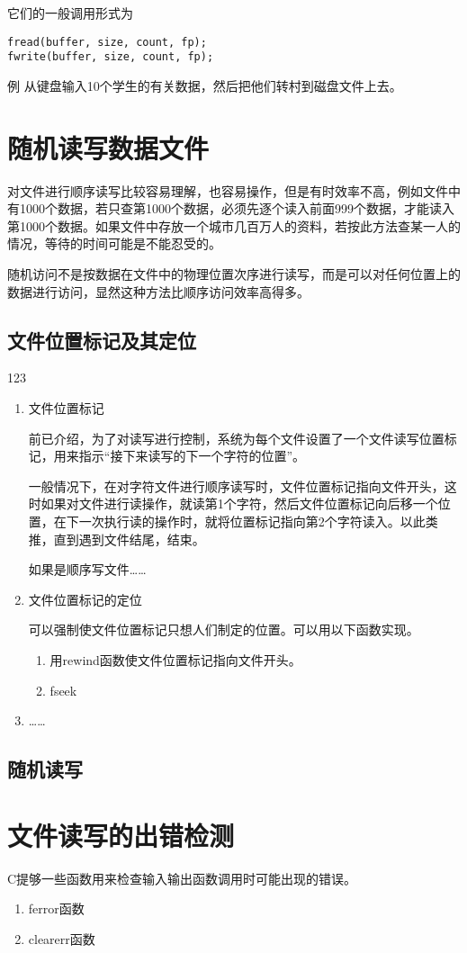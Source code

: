 它们的一般调用形式为
\begin{lstlisting}
fread(buffer, size, count, fp);
fwrite(buffer, size, count, fp);
\end{lstlisting}

例 从键盘输入10个学生的有关数据，然后把他们转村到磁盘文件上去。
\section{随机读写数据文件}
对文件进行顺序读写比较容易理解，也容易操作，但是有时效率不高，例如文件中有1000个数据，若只查第1000个数据，必须先逐个读入前面999个数据，才能读入第1000个数据。如果文件中存放一个城市几百万人的资料，若按此方法查某一人的情况，等待的时间可能是不能忍受的。

随机访问不是按数据在文件中的物理位置次序进行读写，而是可以对任何位置上的数据进行访问，显然这种方法比顺序访问效率高得多。
\subsection{文件位置标记及其定位}
123
\begin{enumerate}
	\item 文件位置标记

		前已介绍，为了对读写进行控制，系统为每个文件设置了一个文件读写位置标记，用来指示“接下来读写的下一个字符的位置”。

		一般情况下，在对字符文件进行顺序读写时，文件位置标记指向文件开头，这时如果对文件进行读操作，就读第1个字符，然后文件位置标记向后移一个位置，在下一次执行读的操作时，就将位置标记指向第2个字符读入。以此类推，直到遇到文件结尾，结束。

		如果是顺序写文件……
	\item 文件位置标记的定位

		可以强制使文件位置标记只想人们制定的位置。可以用以下函数实现。
		\begin{enumerate}
			\item 用rewind函数使文件位置标记指向文件开头。
			\item fseek
		\end{enumerate}
	\item ……
\end{enumerate}
\subsection{随机读写}
\section{文件读写的出错检测}
C提够一些函数用来检查输入输出函数调用时可能出现的错误。
\begin{enumerate}
	\item ferror函数
	\item clearerr函数
\end{enumerate}
